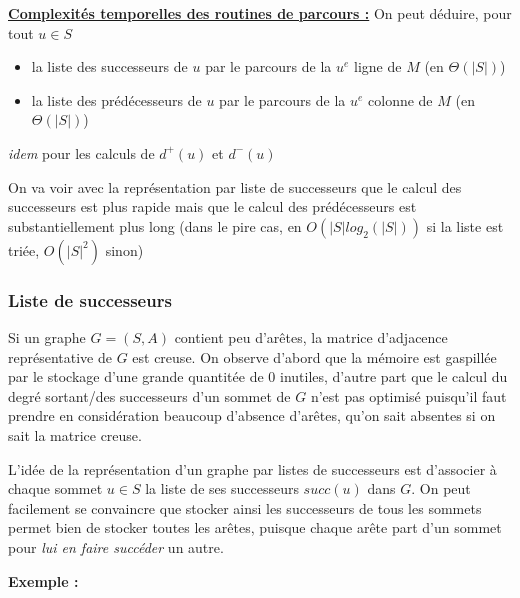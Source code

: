 \documentclass[../../../main.tex]{subfiles}
\begin{document}
\underline{\textbf{Complexités temporelles des routines de parcours :}}\newline
On peut déduire, pour tout $u\in S$
\begin{itemize}
	\item la liste des successeurs de $u$ par le parcours de la $u^e$ ligne de $M$ (en $\Theta(|S|)$)
	\item la liste des prédécesseurs de $u$ par le parcours de la $u^e$ colonne de $M$ (en $\Theta(|S|)$)
\end{itemize}
\textit{idem} pour les calculs de $d^+(u)$ et $d^-(u)$

On va voir avec la représentation par liste de successeurs que le calcul des successeurs est plus rapide mais que le calcul des prédécesseurs est substantiellement plus long (dans le pire cas, en $O(|S|log_2(|S|))$ si la liste est triée, $O(|S|^2)$ sinon)
\subsubsection{Liste de successeurs}
Si un graphe $G = (S, A)$ contient peu d'arêtes, la matrice d'adjacence représentative de $G$ est creuse. On observe d'abord que la mémoire est gaspillée par le stockage d'une grande quantitée de $0$ inutiles, d'autre part que le calcul du degré sortant/des successeurs d'un sommet de $G$ n'est pas optimisé puisqu'il faut prendre en considération beaucoup d'absence d'arêtes, qu'on sait absentes si on sait la matrice creuse.

L'idée de la représentation d'un graphe par listes de successeurs est d'associer à chaque sommet $u\in S$ la liste de ses successeurs $succ(u)$ dans $G$. On peut facilement se convaincre que stocker ainsi les successeurs de tous les sommets permet bien de stocker toutes les arêtes, puisque chaque arête part d'un sommet pour \textit{lui en faire succéder} un autre.

\textbf{Exemple :}
\end{document}
